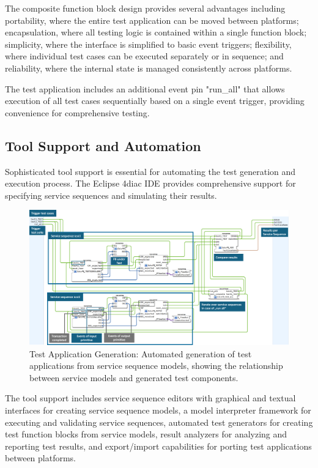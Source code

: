 The composite function block design provides several advantages including portability, where the entire test application can be moved between platforms; encapsulation, where all testing logic is contained within a single function block; simplicity, where the interface is simplified to basic event triggers; flexibility, where individual test cases can be executed separately or in sequence; and reliability, where the internal state is managed consistently across platforms.

The test application includes an additional event pin "run\_all" that allows execution of all test cases sequentially based on a single event trigger, providing convenience for comprehensive testing.

\subsection{Tool Support and Automation}

Sophisticated tool support is essential for automating the test generation and execution process. The Eclipse 4diac IDE provides comprehensive support for specifying service sequences and simulating their results.

\begin{figure}[!htbp]
    \centering
    \includegraphics[width=\linewidth]{MX_Papers/Paper10/Figures/generation_rules.png}
    \caption{Test Application Generation: Automated generation of test applications from service sequence models, showing the relationship between service models and generated test components.}
    \label{fig:generation_rules}
\end{figure}

The tool support includes service sequence editors with graphical and textual interfaces for creating service sequence models, a model interpreter framework for executing and validating service sequences, automated test generators for creating test function blocks from service models, result analyzers for analyzing and reporting test results, and export/import capabilities for porting test applications between platforms.

